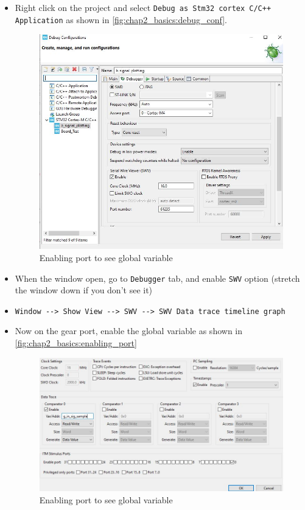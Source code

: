 \documentclass[12pt,a4paper]{book}
\begin{document}
\begin{itemize}

    \item Right click on the project and select \verb|Debug as Stm32 cortex C/C++ Application| as shown in \autoref{fig:chap2_basics:debug_conf}.

\begin{figure}[h]
\centering
\includegraphics[scale=0.5]{Figures_DSP/chap_2_basics/debug_conf_swv_enable}
\caption{Enabling port to see global variable}
\label{fig:chap2_basics:debug_conf}
\end{figure}


    \item  When the window open, go to \verb|Debugger| tab, and enable \verb|SWV| option (stretch the window down if you don't see it)

    \item \verb|Window --> Show View --> SWV --> SWV Data trace timeline graph|


\item Now on the gear port, enable the global variable as shown in \autoref{fig:chap2_basics:enabling_port}


\begin{figure}[h]
\centering
\includegraphics[scale=0.5]{Figures_DSP/chap_2_basics/enabling_port_see_global_var.JPG}
\caption{Enabling port to see global variable}
\label{fig:chap2_basics:enabling_port}
\end{figure}
      

\end{itemize}
\end{document}
